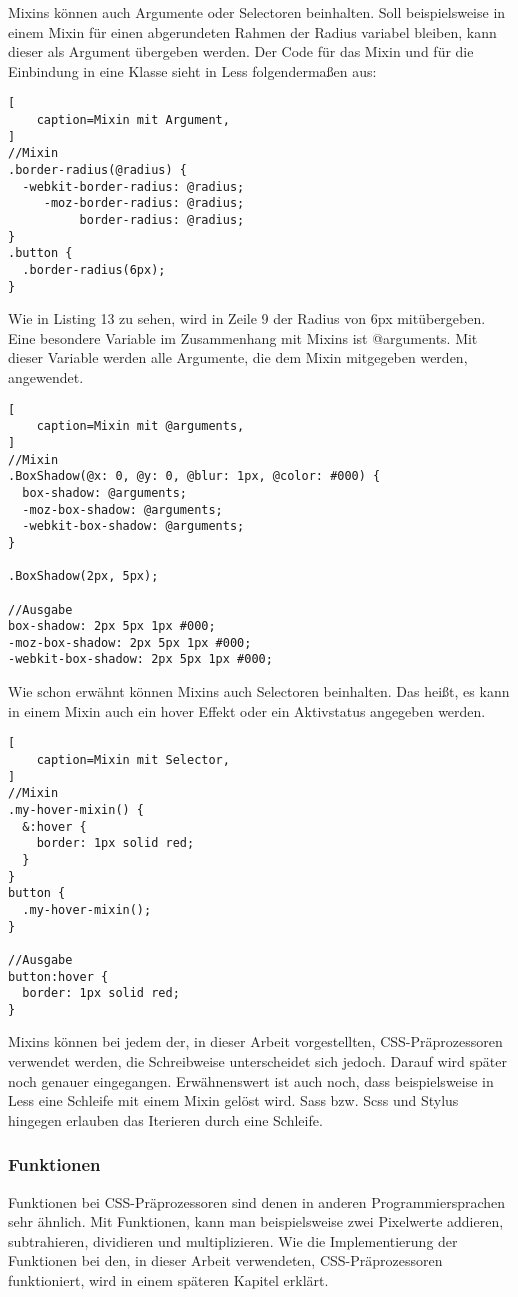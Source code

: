 Mixins können auch Argumente oder Selectoren beinhalten. \newline
Soll beispielsweise in einem Mixin für einen abgerundeten Rahmen der Radius variabel bleiben, kann dieser als Argument übergeben werden. Der Code für das Mixin und für die Einbindung in eine Klasse sieht in Less folgendermaßen aus:
\begin{lstlisting}[
	caption=Mixin mit Argument,
]
//Mixin
.border-radius(@radius) {
  -webkit-border-radius: @radius;
     -moz-border-radius: @radius;
          border-radius: @radius;
}
.button {
  .border-radius(6px);
}
\end{lstlisting}
Wie in Listing 13 zu sehen, wird in Zeile 9 der Radius von 6px mitübergeben. \autocite[]{thecorelessteam.}\newline 
Eine besondere Variable im Zusammenhang mit Mixins ist @arguments. Mit dieser Variable werden alle Argumente, die dem Mixin mitgegeben werden, angewendet. \autocite[]{Gerchev.2012}
\begin{lstlisting}[
	caption=Mixin mit @arguments,
]
//Mixin
.BoxShadow(@x: 0, @y: 0, @blur: 1px, @color: #000) {
  box-shadow: @arguments;
  -moz-box-shadow: @arguments;
  -webkit-box-shadow: @arguments;
}

.BoxShadow(2px, 5px);

//Ausgabe
box-shadow: 2px 5px 1px #000;
-moz-box-shadow: 2px 5px 1px #000;
-webkit-box-shadow: 2px 5px 1px #000;
\end{lstlisting}
Wie schon erwähnt können Mixins auch Selectoren beinhalten. Das heißt, es kann in einem Mixin auch ein hover Effekt oder ein Aktivstatus angegeben werden.
\begin{lstlisting}[
	caption=Mixin mit Selector,
]
//Mixin
.my-hover-mixin() {
  &:hover {
    border: 1px solid red;
  }
}
button {
  .my-hover-mixin();
}

//Ausgabe
button:hover {
  border: 1px solid red;
}
\end{lstlisting}
Mixins können bei jedem der, in dieser Arbeit vorgestellten, CSS-Präprozessoren verwendet werden, die Schreibweise unterscheidet sich jedoch. Darauf wird später noch genauer eingegangen.
Erwähnenswert ist auch noch, dass beispielsweise in Less eine Schleife mit einem Mixin gelöst wird. Sass bzw. Scss und Stylus hingegen erlauben das Iterieren durch eine Schleife.
\subsubsection{Funktionen}
Funktionen bei CSS-Präprozessoren sind denen in anderen Programmiersprachen sehr ähnlich. Mit Funktionen, kann man beispielsweise zwei Pixelwerte addieren, subtrahieren, dividieren und multiplizieren. Wie die Implementierung der Funktionen bei den, in dieser Arbeit verwendeten, CSS-Präprozessoren funktioniert, wird in einem späteren Kapitel erklärt.

